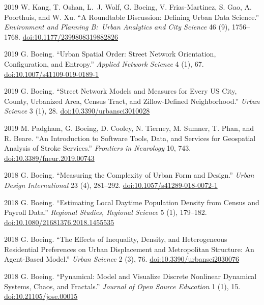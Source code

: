 \documentclass[11pt,letterpaper]{report}
\begin{document}
\begin{tablist}
        \item[2019] \tab{}W. Kang, T. Oshan, L.~J. Wolf, G. Boeing, V. Frias-Martinez, S. Gao, A. Poorthuis, and W. Xu. \enquote{A Roundtable Discussion: Defining Urban Data Science.} \textit{Environment and Planning B:\ Urban Analytics and City Science} 46 (9), 1756--1768. \href{https://doi.org/10.1177/2399808319882826}{doi:10.1177/2399808319882826}

        \item[2019] \tab{}G. Boeing. \enquote{Urban Spatial Order: Street Network Orientation, Configuration, and Entropy.} \textit{Applied Network Science} 4 (1), 67. \href{https://doi.org/10.1007/s41109-019-0189-1}{doi:10.1007/s41109-019-0189-1}

        \item[2019] \tab{}G. Boeing. \enquote{Street Network Models and Measures for Every US City, County, Urbanized Area, Census Tract, and Zillow-Defined Neighborhood.} \textit{Urban Science} 3 (1), 28. \href{https://doi.org/10.3390/urbansci3010028}{doi:10.3390/urbansci3010028}

        \item[2019] \tab{}M. Padgham, G. Boeing, D. Cooley, N. Tierney, M. Sumner, T. Phan, and R. Beare. \enquote{An Introduction to Software Tools, Data, and Services for Geospatial Analysis of Stroke Services.} \textit{Frontiers in Neurology} 10, 743. \href{https://doi.org/10.3389/fneur.2019.00743}{doi:10.3389/fneur.2019.00743}

        \item[2018] \tab{}G. Boeing. \enquote{Measuring the Complexity of Urban Form and Design.} \textit{Urban Design International} 23 (4), 281--292. \href{https://doi.org/10.1057/s41289-018-0072-1}{doi:10.1057/s41289-018-0072-1}

        \item[2018] \tab{}G. Boeing. \enquote{Estimating Local Daytime Population Density from Census and Payroll Data.} \textit{Regional Studies, Regional Science} 5 (1), 179--182. \href{https://doi.org/10.1080/21681376.2018.1455535}{doi:10.1080/21681376.2018.1455535}

        \item[2018] \tab{}G. Boeing. \enquote{The Effects of Inequality, Density, and Heterogeneous Residential Preferences on Urban Displacement and Metropolitan Structure: An Agent-Based Model.} \textit{Urban Science} 2 (3), 76. \href{https://doi.org/10.3390/urbansci2030076}{doi:10.3390/urbansci2030076}

        \item[2018] \tab{}G. Boeing. \enquote{Pynamical: Model and Visualize Discrete Nonlinear Dynamical Systems, Chaos, and Fractals.} \textit{Journal of Open Source Education} 1 (1), 15. \href{https://doi.org/10.21105/jose.00015}{doi:10.21105/jose.00015}


\end{tablist}
\end{document}

